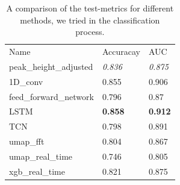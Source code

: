 \begin{table}[]
\centering
\caption{A comparison of the test-metrics for different methods, we tried in the classification process.}
\label{tab:Metric Comparison}
\begin{tabular}{lll}
Name                   & Accuracay & AUC   \\
peak\_height\_adjusted & \textit{0.836}     & \textit{0.875} \\
1D\_conv               & 0.855     & 0.906 \\
feed\_forward\_network & 0.796     & 0.87  \\
LSTM                   & \textbf{0.858}     & \textbf{0.912} \\
TCN                    & 0.798     & 0.891 \\
umap\_fft              & 0.804     & 0.867 \\
umap\_real\_time       & 0.746     & 0.805 \\
xgb\_real\_time        & 0.821     & 0.875
\end{tabular}
\end{table}